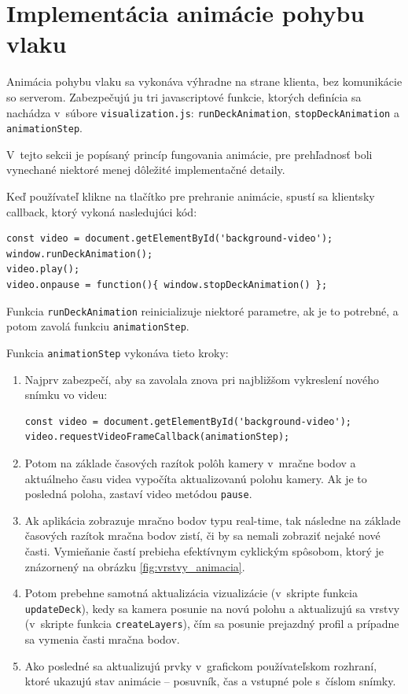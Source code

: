 \section{Implementácia animácie pohybu vlaku}
\label{sec:implementacia_animacie}

Animácia pohybu vlaku sa vykonáva výhradne na strane klienta, bez komunikácie so serverom. Zabezpečujú ju tri javascriptové funkcie, ktorých definícia sa nachádza v~súbore \texttt{visualization.js}: \texttt{runDeckAnimation}, \texttt{stopDeckAnimation} a \texttt{animationStep}.

V~tejto sekcii je popísaný princíp fungovania animácie, pre prehľadnosť boli vynechané niektoré menej dôležité implementačné detaily.

Keď používateľ klikne na tlačítko pre prehranie animácie, spustí sa klientsky callback, ktorý vykoná nasledujúci kód:

\begin{lstlisting}
const video = document.getElementById('background-video');
window.runDeckAnimation();
video.play();
video.onpause = function(){ window.stopDeckAnimation() };
\end{lstlisting}

Funkcia \texttt{runDeckAnimation} reinicializuje niektoré parametre, ak je to potrebné, a potom zavolá funkciu \texttt{animationStep}.

Funkcia \texttt{animationStep} vykonáva tieto kroky:

\begin{enumerate}
    \item Najprv zabezpečí, aby sa zavolala znova pri najbližšom vykreslení nového snímku vo videu:
    \begin{lstlisting}
const video = document.getElementById('background-video');
video.requestVideoFrameCallback(animationStep);
    \end{lstlisting}

    \item Potom na základe časových razítok polôh kamery v~mračne bodov a aktuálneho času videa vypočíta aktualizovanú polohu kamery. Ak je to posledná poloha, zastaví video metódou \texttt{pause}.

    \item Ak aplikácia zobrazuje mračno bodov typu real-time, tak následne na základe časových razítok mračna bodov zistí, či by sa nemali zobraziť nejaké nové časti. Vymieňanie častí prebieha efektívnym cyklickým spôsobom, ktorý je znázornený na obrázku \ref{fig:vrstvy_animacia}.

    \item Potom prebehne samotná aktualizácia vizualizácie (v~skripte funkcia \texttt{updateDeck}), kedy sa kamera posunie na novú polohu a aktualizujú sa vrstvy (v~skripte funkcia \texttt{createLayers}), čím sa posunie prejazdný profil a prípadne sa vymenia časti mračna bodov.

    \item Ako posledné sa aktualizujú prvky v~grafickom používateľskom rozhraní, ktoré ukazujú stav animácie -- posuvník, čas a vstupné pole s~číslom snímky.
\end{enumerate}

